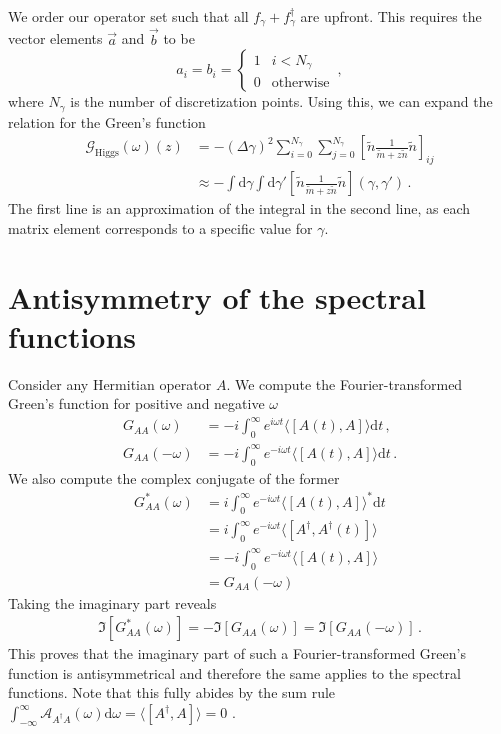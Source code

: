 \documentclass[
    reprint, 
    aps,
    preprintnumbers,
    twocolumn,
    prb,
    superscriptaddress
]{revtex4-2}
\newcommand{\dgamma}{\mathrm{d}\gamma}
\newcommand{\greens}[1]{\mathcal{G}_\text{#1} (\omega)}
\begin{document}
We order our operator set such that all $f_\gamma + f_\gamma^{\dagger}$ are upfront. 
This requires the vector elements $\vec{a}$ and $\vec{b}$ to be
\begin{equation}
    a_i = b_i = \begin{cases}
        1 & i < N_\gamma \\
        0 & \text{otherwise}
    \end{cases}\,,
\end{equation}
where $N_\gamma$ is the number of discretization points.
Using this, we can expand the relation for the Green's function
\begin{align}
    \greens{Higgs} (z) &= -(\Delta \gamma)^2 \sum_{i=0}^{N_\gamma} \sum_{j=0}^{N_\gamma} \left[ \tilde{n} \frac{1}{\tilde{m} + z \tilde{n}} \tilde{n} \right]_{ij} \nonumber \\
        &\approx - \int \dgamma \int \dgamma' \left[ \tilde{n} \frac{1}{\tilde{m} + z \tilde{n}} \tilde{n} \right](\gamma, \gamma')\,.
\end{align}
The first line is an approximation of the integral in the second line, as each matrix element corresponds to a specific value for $\gamma$.

\section{Antisymmetry of the spectral functions}
\label{sec:antisymmetry_spectral}

Consider any Hermitian operator $A$. 
We compute the Fourier-transformed Green's function for positive and negative $\omega$
\begin{align}
    G_{AA}(\omega) &= -i \int_0^\infty e^{i \omega t} \langle [A(t), A] \rangle \mathrm{d}t\,, \nonumber \\
    G_{AA}(- \omega) &= -i \int_0^\infty e^{-i \omega t} \langle [A(t), A] \rangle \mathrm{d}t\,.
\end{align}
We also compute the complex conjugate of the former
\begin{align}
    G_{AA}^* (\omega) &= i \int_0^\infty e^{-i \omega t} \langle [A(t), A] \rangle^* \mathrm{d}t \nonumber \\
        &= i \int_0^\infty e^{-i \omega t} \langle [A^\dagger, A^\dagger(t)] \rangle \\
        &= -i \int_0^\infty e^{-i \omega t} \langle [A(t), A] \rangle \\
        &= G_{AA}(- \omega)
\end{align}
Taking the imaginary part reveals
\begin{align}
    \Im [ G_{AA}^* (\omega) ] = - \Im [G_{AA} (\omega) ] = \Im [G_{AA} (-\omega)]\,.
\end{align}
This proves that the imaginary part of such a Fourier-transformed Green's function is antisymmetrical and therefore the same applies to the spectral functions.
Note that this fully abides by the sum rule $\int_{-\infty}^\infty \mathcal{A}_{A^\dagger A} (\omega) \mathrm{d}\omega = \langle [A^\dagger, A] \rangle = 0$ \cite{rickayzen80}.




%
		
\end{document}
